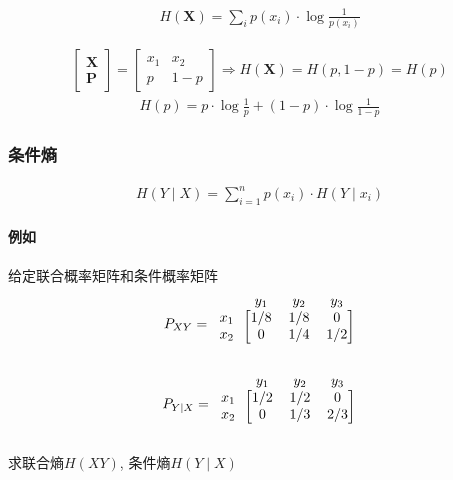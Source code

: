 \documentclass[a4paper]{report}
\begin{document}
\begin{align*}
  H(\textbf{X})=\displaystyle\sum_{i} p(x_i)\cdot\log{\frac{1}{p(x_i)}}
\end{align*}

\begin{gather}
  \begin{bmatrix}
    \textbf{X}\\\textbf{P}
  \end{bmatrix}=
  \begin{bmatrix}
    x_1 & x_2 \\
    p & 1-p
  \end{bmatrix}
  \Rightarrow 
  H(\textbf{X})=H(p,1-p)=H(p)
\end{gather}
\begin{align*}
  H(p)=p\cdot\log{\frac{1}{p}}+(1-p)\cdot\log{\frac{1}{1-p}}
\end{align*}

\subsubsection{条件熵}
\begin{align}
  H(Y\mid X)=\displaystyle\sum_{i=1}^{n} p(x_i)\cdot H(Y\mid x_i)
\end{align}

\paragraph{例如}给定联合概率矩阵和条件概率矩阵
\[
  P_{XY}=
\begin{blockarray}{cccc}
 &y_1 & y_2 & y_3  \\
\begin{block}{c[ccc]}
  x_1 & 1/8 & 1/8 & 0 \\
  x_2 & 0 & 1/4 & 1/2 \\
\end{block}
\end{blockarray}
 \]

\[
  P_{Y|X}=
\begin{blockarray}{cccc}
 &y_1 & y_2 & y_3  \\
\begin{block}{c[ccc]}
  x_1 & 1/2 & 1/2 & 0 \\
  x_2 & 0 & 1/3 & 2/3 \\
\end{block}
\end{blockarray}
 \]

 求联合熵$H(XY)$, 条件熵$H(Y\mid X)$
\end{document}
